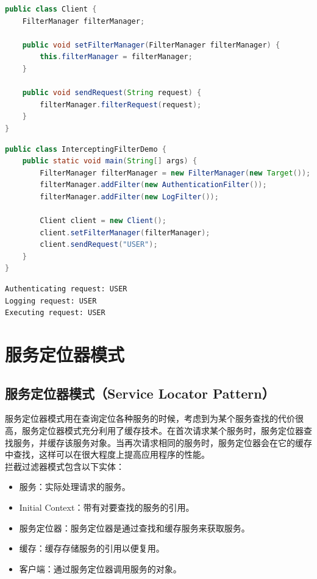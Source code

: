 \begin{lstlisting}[language=Java, title=Client.java]
public class Client {
	FilterManager filterManager;

	public void setFilterManager(FilterManager filterManager) {
		this.filterManager = filterManager;
	}

	public void sendRequest(String request) {
		filterManager.filterRequest(request);
	}
}
\end{lstlisting}

\begin{lstlisting}[language=Java, title=InterceptingFilterDemo.java]
public class InterceptingFilterDemo {
	public static void main(String[] args) {
		FilterManager filterManager = new FilterManager(new Target());
		filterManager.addFilter(new AuthenticationFilter());
		filterManager.addFilter(new LogFilter());

		Client client = new Client();
		client.setFilterManager(filterManager);
		client.sendRequest("USER");
	}
}
\end{lstlisting}

\begin{tcolorbox}
    \begin{verbatim}
Authenticating request: USER
Logging request: USER
Executing request: USER
\end{verbatim}
\end{tcolorbox}

\newpage

\section{服务定位器模式}

\subsection{服务定位器模式（Service Locator Pattern）}

服务定位器模式用在查询定位各种服务的时候，考虑到为某个服务查找的代价很高，服务定位器模式充分利用了缓存技术。在首次请求某个服务时，服务定位器查找服务，并缓存该服务对象。当再次请求相同的服务时，服务定位器会在它的缓存中查找，这样可以在很大程度上提高应用程序的性能。\\

拦截过滤器模式包含以下实体：

\begin{itemize}
    \item 服务：实际处理请求的服务。

    \item Initial Context：带有对要查找的服务的引用。

    \item 服务定位器：服务定位器是通过查找和缓存服务来获取服务。

    \item 缓存：缓存存储服务的引用以便复用。

    \item 客户端：通过服务定位器调用服务的对象。
\end{itemize}

